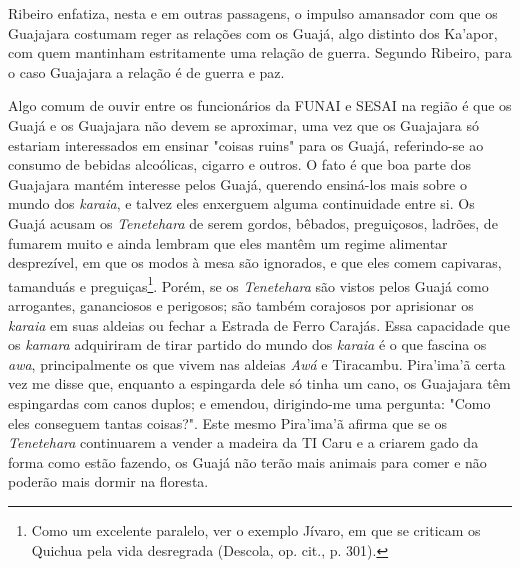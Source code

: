 Ribeiro enfatiza, nesta e em outras passagens, o impulso amansador com
que os Guajajara costumam reger as relações com os Guajá, algo distinto
dos Ka'apor, com quem mantinham estritamente uma relação de guerra.
Segundo Ribeiro, para o caso Guajajara a relação é de guerra e paz.

Algo comum de ouvir entre os funcionários da FUNAI e SESAI na região é
que os Guajá e os Guajajara não devem se aproximar, uma vez que os
Guajajara só estariam interessados em ensinar "coisas ruins" para os
Guajá, referindo-se ao consumo de bebidas alcoólicas, cigarro e outros.
O fato é que boa parte dos Guajajara mantém interesse pelos Guajá,
querendo ensiná-los mais sobre o mundo dos \emph{karaia}, e talvez eles
enxerguem alguma continuidade entre si. Os Guajá acusam os
\emph{Tenetehara} de serem gordos, bêbados, preguiçosos, ladrões, de
fumarem muito e ainda lembram que eles mantêm um regime alimentar
desprezível, em que os modos à mesa são ignorados, e que eles comem
capivaras, tamanduás e preguiças\footnote{Como um excelente paralelo,
  ver o exemplo Jívaro, em que se criticam os Quichua pela vida
  desregrada (Descola, op. cit., p. 301).}. Porém, se os
\emph{Tenetehara} são vistos pelos Guajá como arrogantes, gananciosos e
perigosos; são também corajosos por aprisionar os \emph{karaia} em suas
aldeias ou fechar a Estrada de Ferro Carajás. Essa capacidade que os
\emph{kamara} adquiriram de tirar partido do mundo dos \emph{karaia} é o
que fascina os \emph{awa}, principalmente os que vivem nas aldeias
\emph{Awá} e Tiracambu. Pira'ima'ã certa vez me disse que, enquanto a
espingarda dele só tinha um cano, os Guajajara têm espingardas com canos
duplos; e emendou, dirigindo-me uma pergunta: "Como eles conseguem
tantas coisas?". Este mesmo Pira'ima'ã afirma que se os
\emph{Tenetehara} continuarem a vender a madeira da TI Caru e a criarem
gado da forma como estão fazendo, os Guajá não terão mais animais para
comer e não poderão mais dormir na floresta.

